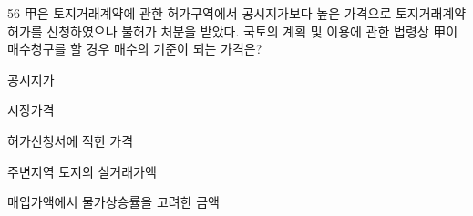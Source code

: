 \begin{question}{56}
甲은 토지거래계약에 관한 허가구역에서 공시지가보다 높은 가격으로 토지거래계약 허가를 신청하였으나 불허가 처분을 받았다. 국토의 계획 및 이용에 관한 법령상 甲이 매수청구를 할 경우 매수의 기준이 되는 가격은?
\begin{choices}
  \item 공시지가
  \item 시장가격
  \item 허가신청서에 적힌 가격
  \item 주변지역 토지의 실거래가액
  \item 매입가액에서 물가상승률을 고려한 금액
\end{choices}
\end{question}
